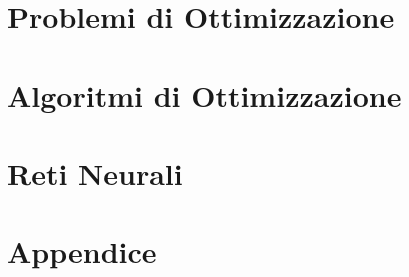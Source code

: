 \documentclass[11pt,a4paper,oneside,final,reqno]{amsbook}
\numberwithin{equation}{section}
\begin{document}
\part{Problemi di Ottimizzazione}


\part{Algoritmi di Ottimizzazione}






\part{Reti Neurali}







%


\part{Appendice}
\appendix





\end{document}
